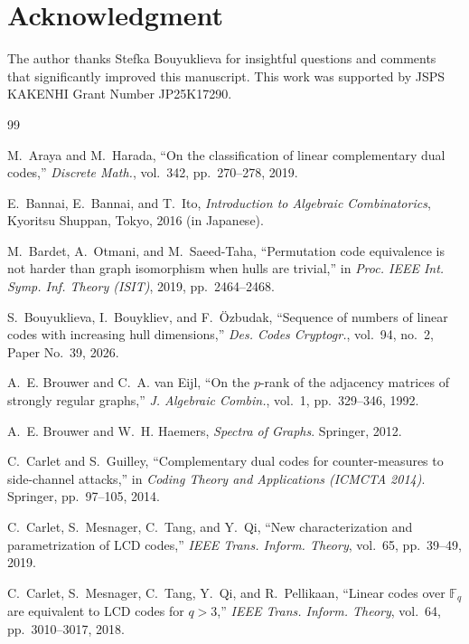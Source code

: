 \documentclass[a4paper,11pt]{article}
\theoremstyle{remark}
\begin{document}
\section*{Acknowledgment}

The author thanks Stefka Bouyuklieva for insightful questions and comments that significantly improved this manuscript. This work was supported by JSPS KAKENHI Grant Number JP25K17290.

\begin{thebibliography}{99}

M.~Araya and M.~Harada,
``On the classification of linear complementary dual codes,''
\emph{Discrete Math.}, vol.~342, pp.~270--278, 2019.

E.~Bannai, E.~Bannai, and T.~Ito,
\emph{Introduction to Algebraic Combinatorics},
Kyoritsu Shuppan, Tokyo, 2016 (in Japanese).

M.~Bardet, A.~Otmani, and M.~Saeed-Taha,
``Permutation code equivalence is not harder than graph isomorphism when hulls are trivial,''
in \emph{Proc. IEEE Int. Symp. Inf. Theory (ISIT)}, 2019, pp.~2464--2468.

S.~Bouyuklieva, I.~Bouykliev, and F.~\"Ozbudak,
``Sequence of numbers of linear codes with increasing hull dimensions,''
\emph{Des. Codes Cryptogr.}, vol.~94, no.~2, Paper No.~39, 2026.

A.~E. Brouwer and C.~A. van Eijl,
``On the $p$-rank of the adjacency matrices of strongly regular graphs,''
\emph{J. Algebraic Combin.}, vol.~1, pp.~329--346, 1992.

A.~E. Brouwer and W.~H. Haemers,
\emph{Spectra of Graphs}.
Springer, 2012.

C.~Carlet and S.~Guilley,
``Complementary dual codes for counter-measures to side-channel attacks,''
in \emph{Coding Theory and Applications (ICMCTA 2014)}.
Springer, pp.~97--105, 2014.


C.~Carlet, S.~Mesnager, C.~Tang, and Y.~Qi,
``New characterization and parametrization of LCD codes,''
\emph{IEEE Trans. Inform. Theory}, vol.~65, pp.~39--49, 2019.

C.~Carlet, S.~Mesnager, C.~Tang, Y.~Qi, and R.~Pellikaan,
``Linear codes over $\mathbb{F}_q$ are equivalent to LCD codes for $q > 3$,''
\emph{IEEE Trans. Inform. Theory}, vol.~64, pp.~3010--3017, 2018.


\end{thebibliography}
\end{document}
